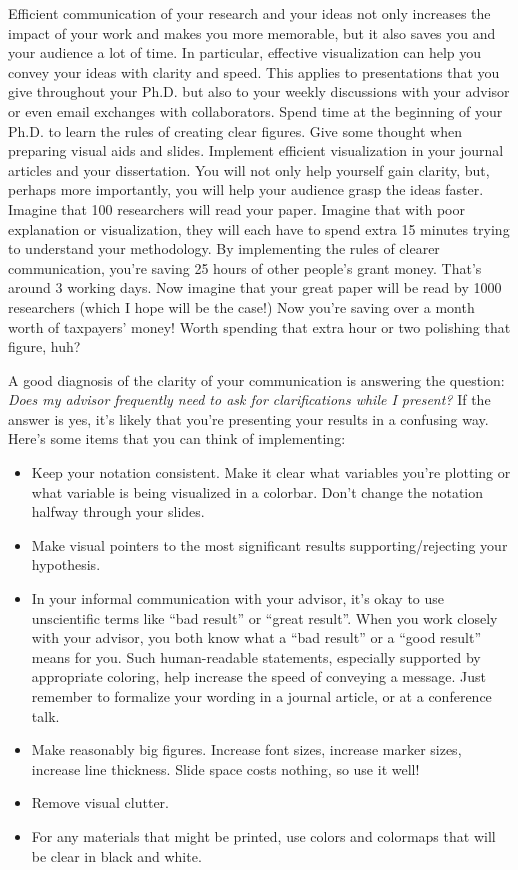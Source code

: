 \documentclass[10pt,twocolumn]{article}
\begin{document}
Efficient communication of your research and your ideas not only increases the impact of your work and makes you more memorable, but it also saves you and your audience a lot of time. In particular, effective visualization can help you convey your ideas with clarity and speed. This applies to presentations that you give throughout your Ph.D. but also to your weekly discussions with your advisor or even email exchanges with collaborators. Spend time at the beginning of your Ph.D. to learn the rules of creating clear figures. Give some thought when preparing visual aids and slides. Implement efficient visualization in your journal articles and your dissertation. You will not only help yourself gain clarity, but, perhaps more importantly, you will help your audience grasp the ideas faster. Imagine that 100 researchers will read your paper. Imagine that with poor explanation or visualization, they will each have to spend extra 15 minutes trying to understand your methodology. By implementing the rules of clearer communication, you’re saving 25 hours of other people’s grant money. That’s around 3 working days. Now imagine that your great paper will be read by 1000 researchers (which I hope will be the case!) Now you’re saving over a month worth of taxpayers’ money! Worth spending that extra hour or two polishing that figure, huh?

A good diagnosis of the clarity of your communication is answering the question: \textit{Does my advisor frequently need to ask for clarifications while I present?} If the answer is yes, it’s likely that you’re presenting your results in a confusing way. Here’s some items that you can think of implementing:

\begin{itemize}
\item Keep your notation consistent. Make it clear what variables you’re plotting or what variable is being visualized in a colorbar. Don’t change the notation halfway through your slides.
\item Make visual pointers to the most significant results supporting/rejecting your hypothesis.
\item In your informal communication with your advisor, it’s okay to use unscientific terms like “bad result” or “great result”. When you work closely with your advisor, you both know what a “bad result” or a “good result” means for you. Such human-readable statements, especially supported by appropriate coloring, help increase the speed of conveying a message. Just remember to formalize your wording in a journal article, or at a conference talk.
\item Make reasonably big figures. Increase font sizes, increase marker sizes, increase line thickness. Slide space costs nothing, so use it well!
\item Remove visual clutter.
\item For any materials that might be printed, use colors and colormaps that will be clear in black and white.
\end{itemize}
\end{document}
